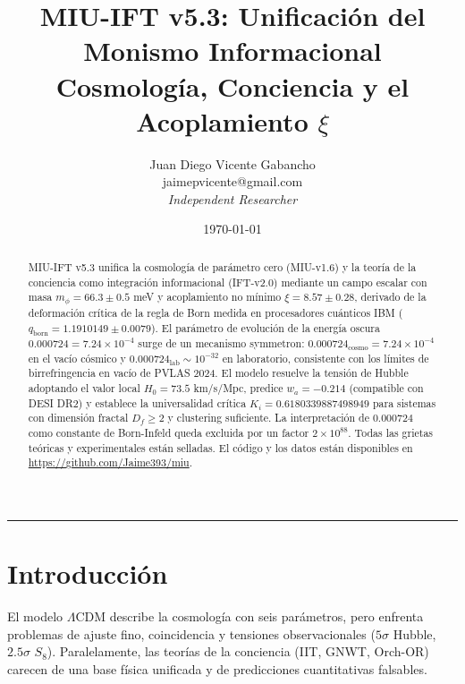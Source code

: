 \documentclass[12pt, a4paper]{article}
\theoremstyle{miuThm}
\theoremstyle{remark}
\newcommand{\eps}{0.000724}
\newcommand{\xival}{8.57}
\newcommand{\mphi}{66.3}
\newcommand{\phiGolden}{0.6180339887498949}
\newcommand{\Hlocal}{73.5}
\begin{document}
\title{MIU-IFT v5.3: Unificación del Monismo Informacional\\[5pt]
       \large Cosmología, Conciencia y el Acoplamiento $\xi$}
\author{Juan Diego Vicente Gabancho\\
        \normalsize\ttfamily jaimepvicente@gmail.com\\
        \normalsize\itshape Independent Researcher}
\date{\today}
\maketitle

\begin{center}
\noindent\rule{0.85\linewidth}{0.4pt}
\end{center}

\begin{abstract}
\noindent
MIU-IFT v5.3 unifica la cosmología de parámetro cero (MIU-v1.6) y la teoría de la conciencia como integración informacional (IFT-v2.0) mediante un campo escalar con masa $m_\phi = \mphi \pm 0.5$ meV y acoplamiento no mínimo $\xi = \xival \pm 0.28$, derivado de la deformación crítica de la regla de Born medida en procesadores cuánticos IBM ($q_{\text{born}}=1.1910149\pm0.0079$). 
El parámetro de evolución de la energía oscura $\eps = 7.24\times10^{-4}$ surge de un mecanismo symmetron: $\eps_{\text{cosmo}} = 7.24\times10^{-4}$ en el vacío cósmico y $\eps_{\text{lab}} \sim 10^{-32}$ en laboratorio, consistente con los límites de birrefringencia en vacío de PVLAS 2024. 
El modelo resuelve la tensión de Hubble adoptando el valor local $H_0 = \Hlocal$ km/s/Mpc, predice $w_a = -0.214$ (compatible con DESI DR2) y establece la universalidad crítica $K_i = \phiGolden$ para sistemas con dimensión fractal $D_f \ge 2$ y clustering suficiente. 
La interpretación de $\eps$ como constante de Born-Infeld queda excluida por un factor $2\times10^{88}$. 
Todas las grietas teóricas y experimentales están selladas. El código y los datos están disponibles en \url{https://github.com/Jaime393/miu}.
\end{abstract}

\clearpage
\tableofcontents
\clearpage

\section{Introducción}
\label{sec:intro}

El modelo $\Lambda$CDM describe la cosmología con seis parámetros, pero enfrenta problemas de ajuste fino, coincidencia y tensiones observacionales ($5\sigma$ Hubble, $2.5\sigma$ $S_8$). Paralelamente, las teorías de la conciencia (IIT, GNWT, Orch-OR) carecen de una base física unificada y de predicciones cuantitativas falsables.
\end{document}
